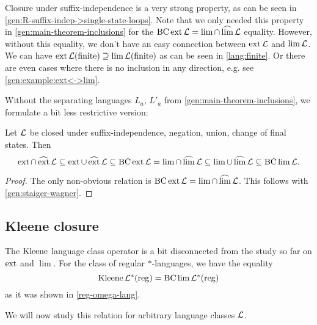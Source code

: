 Closure under suffix-independence is a very strong property, as can be seen in \cref{gen:R-suffix-indep->single-state-loops}. Note that we only needed this property in \cref{gen:main-theorem-inclusions} for the $\operatorname{BC} \operatorname{ext} \mathcal{L} = \lim \cap \operatorname{\widehat{lim}} \mathcal{L}$ equality. However, without this equality, we don't have an easy connection between $\operatorname{ext} \mathcal{L}$ and $\lim \mathcal{L}$. We can have $\operatorname{ext} \mathcal{L}(\textup{\textrm{finite}}) \supseteq \lim \mathcal{L}(\textup{\textrm{finite}})$ as can be seen in \cref{lang:finite}. Or there are even cases where there is no inclusion in any direction, e.g. see \cref{gen:example:ext<->lim}.

Without the separating languages $L_a$, $L'_a$ from \cref{gen:main-theorem-inclusions}, we formulate a bit less restrictive version:
\begin{lemma}
Let $\mathcal{L}$ be closed under suffix-independence, negation, union, change of final states. Then
\[ \operatorname{ext} \cap \operatorname{\widehat{ext}} \mathcal{L} \subseteq
\operatorname{ext} \cup \operatorname{\widehat{ext}} \mathcal{L} \subseteq
\operatorname{BC} \operatorname{ext} \mathcal{L} =
\lim \cap \operatorname{\widehat{lim}} \mathcal{L} \subseteq
\lim \cup \operatorname{\widehat{lim}} \mathcal{L} \subseteq
\operatorname{BC} \lim \mathcal{L} . \]
\begin{proof}
The only non-obvious relation is $\operatorname{BC} \operatorname{ext} \mathcal{L} = \lim \cap \operatorname{\widehat{lim}} \mathcal{L}$. This follows with \cref{gen:staiger-wagner}.
\end{proof}
\end{lemma}


\subsection{Kleene closure}

The $\operatorname{Kleene}$ language class operator is a bit disconnected from the study so far on $\operatorname{ext}$ and $\lim$. For the class of regular $*$-languages, we have the equality
\[ \operatorname{Kleene} \mathcal{L}^*(\textup{\textrm{reg}}) = \operatorname{BC} \lim \mathcal{L}^*(\textup{\textrm{reg}}) \]
as it was shown in \cref{reg-omega-lang}.

We will now study this relation for arbitrary language classes $\mathcal{L}$.

